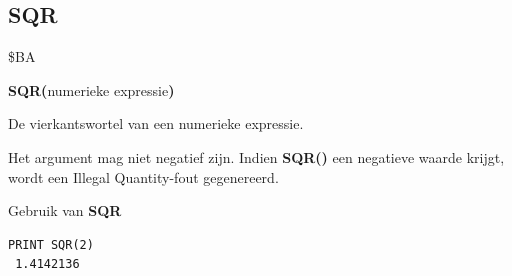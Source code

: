 
\newpage
\subsection{SQR}
\begin{description}[leftmargin=2cm,style=nextline]
\item [Token:]    \$BA

\item [Formaat:]   {\bf SQR(}numerieke expressie{\bf)}

\item [Retourneert:]  De vierkantswortel van een numerieke expressie.

\item [Opmerkingen:]  Het argument mag niet negatief zijn. Indien {\bf SQR()} een negatieve waarde krijgt, wordt een Illegal Quantity-fout gegenereerd.

\item [Voorbeeld:]  Gebruik van {\bf SQR}

\begin{tcolorbox}[colback=black,coltext=white]
\verbatimfont{\codefont}
\begin{verbatim}
PRINT SQR(2)
 1.4142136
\end{verbatim}
\end{tcolorbox}
\end{description}


\newpage
